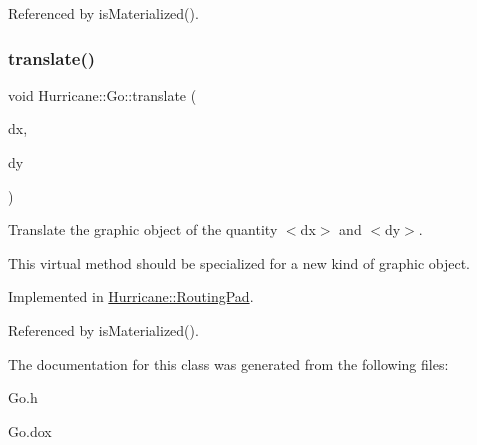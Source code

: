 Referenced by is\+Materialized().

\mbox{\label{classHurricane_1_1Go_a54c4351dbbf4045e1aa89f06bb893402}} 
\subsubsection{\texorpdfstring{translate()}{translate()}}
{\footnotesize\ttfamily void Hurricane\+::\+Go\+::translate (\begin{DoxyParamCaption}\item[{const \hyperlink{group__DbUGroup_ga4fbfa3e8c89347af76c9628ea06c4146}{Db\+U\+::\+Unit} \&}]{dx,  }\item[{const \hyperlink{group__DbUGroup_ga4fbfa3e8c89347af76c9628ea06c4146}{Db\+U\+::\+Unit} \&}]{dy }\end{DoxyParamCaption})\hspace{0.3cm}{\ttfamily [pure virtual]}}

Translate the graphic object of the quantity {\ttfamily $<$dx$>$} and {\ttfamily $<$dy$>$}.

This virtual method should be specialized for a new kind of graphic object. 

Implemented in \hyperlink{classHurricane_1_1RoutingPad_a41bf66ffda0c0ceaaebc67acd72d5b36}{Hurricane\+::\+Routing\+Pad}.



Referenced by is\+Materialized().



The documentation for this class was generated from the following files\+:\begin{DoxyCompactItemize}
\item 
Go.\+h\item 
Go.\+dox\end{DoxyCompactItemize}
